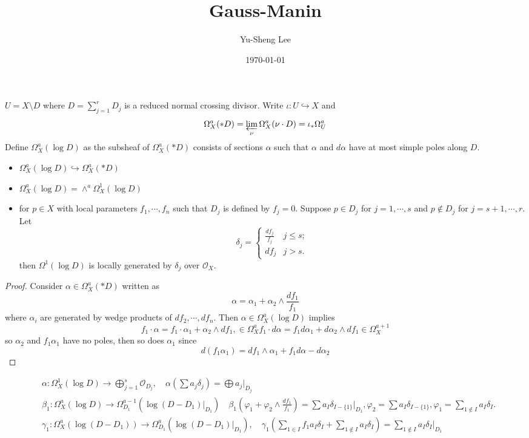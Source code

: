 \documentclass[leqno]{amsart}
\newcommand{\1}{\mathbf{1}}
\theoremstyle{definition}
\theoremstyle{remark}
\begin{document}
\title{Gauss-Manin}
\author[Y-S.~Lee]{Yu-Sheng Lee}
\address{Department of Mathematics, University  of Michigan, Ann Arbor, MI 48109, USA}
\date{\today}

\maketitle
\setcounter{tocdepth}{1}
\tableofcontents


$U=X\setminus D$ where
$D=\sum_{j=1}^rD_j$ is a reduced normal crossing divisor.
Write $\iota\colon U\hookrightarrow X$ and
\[
	 \Omega_X^a(*D)=\varprojlim_\nu \Omega_X^a(\nu\cdot D)
	 =\iota_*\Omega_U^a
\]
Define $\Omega_X^a(\log D)$ as the subsheaf of $\Omega_X^a(*D)$
consists of sections  $\alpha$ such that 
$\alpha$ and  $d\alpha$ have at most simple poles along  $D$.
\begin{itemize}
	\item $\Omega_X^a(\log D)\hookrightarrow \Omega_X^a(*D)$
	\item  $\Omega_X^a(\log D)=\wedge^a \Omega_X^1(\log D)$
	\item for  $p\in X$ with local parameters
		 $f_1,\cdots,f_n$ such that 
		 $D_j$ is defined by  $f_j=0$.
		 Suppose  $p\in D_j$ for  $j=1,\cdots,s$ and 
		 $p\notin D_j$ for  $j=s+1,\cdots,r$.
		 Let
		 \[
		 	\delta_j=
			\begin{cases}
				\frac{df_j}{f_j} & j\leq s;\\
				df_j & j>s.
			\end{cases}
		 \]
		 then $\Omega^1(\log D)$
		 is locally generated by $\delta_j$
		 over  $\mathcal{O}_X$.
\end{itemize}
\begin{proof}
	Consider $\alpha\in \Omega_X^a(*D)$ written as
	 \[
		\alpha=\alpha_1+\alpha_2\wedge\frac{df_1}{f_1}
	\]
	where $\alpha_i$ are generated by wedge products
	of  $df_2,\cdots,df_n$. 
	Then $\alpha\in \Omega_X^a(\log D)$ implies
	 \[
	f_1\cdot \alpha=f_1\cdot\alpha_1+\alpha_2\wedge df_1,
	\in \Omega_X^a
	f_1\cdot d\alpha=f_1d\alpha_1+d\alpha_2\wedge df_1
	\in \Omega_X^{a+1}
	\]
	so $\alpha_2$ and  $f_1\alpha_1$ have no poles,
	then so does $\alpha_1$ since
	 \[
		 d(f_1\alpha_1)=
		 df_1\wedge\alpha_1+f_1d\alpha-d\alpha_2
	\]
\end{proof}

\begin{align}
	&\alpha\colon \Omega_X^1(\log D)\to
	\bigoplus_{j=1}^s\mathcal{O}_{D_j},\quad
	\alpha(\sum a_j\delta_j)=\bigoplus a_j\vert_{D_j}\\
	&\beta_1\colon \Omega_X^a(\log D)\to 
	\Omega_{D_1}^{a-1}(\log(D-D_1)\vert_{D_1})\quad
	\beta_1(\varphi_1+\varphi_2\wedge\frac{df_1}{f_1})
	=\sum a_I\delta_{I-\{1\}}\vert_{D_1},
	\varphi_2=\sum a_I\delta_{I-\{1\}},
	\varphi_1=\sum_{1\notin I} a_I\delta_I.\\
	&\gamma_1\colon 
	\Omega_X^a(\log(D-D_1))\to 
	\Omega_{D_1}^a(\log(D-D_1)\vert_{D_1}),\quad
	\gamma_1(\sum_{1\in I}f_1a_I\delta_I+
	\sum_{1\notin I}a_I\delta_I)=
	\sum_{1\notin I}a_I\delta_I\vert_{D_1}
\end{align}
\end{document}
